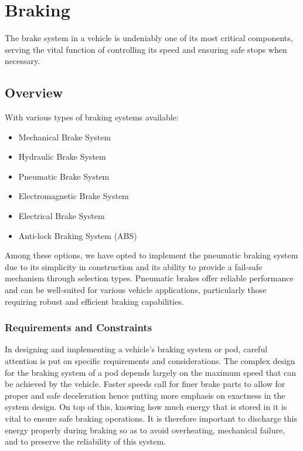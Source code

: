 \section{Braking}
The brake system in a vehicle is undeniably one of its most critical components, serving the vital function of controlling its speed and ensuring safe stops when necessary.


\subsection{Overview}
With various types of braking systems available:

\begin{itemize}
    \item Mechanical Brake System
    \item Hydraulic Brake System
    \item Pneumatic Brake System
    \item Electromagnetic Brake System
    \item Electrical Brake System
  
    \item Anti-lock Braking System (ABS)
  
    
\end{itemize}

Among these options, we have opted to implement the pneumatic braking system due to its simplicity in construction and its ability to provide a fail-safe mechanism through selection types. Pneumatic brakes offer reliable performance and can be well-suited for various vehicle applications, particularly those requiring robust and efficient braking capabilities.
\subsubsection{Requirements and Constraints}
In designing and implementing a vehicle's braking system or pod, careful attention is put on specific requirements and considerations. The complex design for the braking system of a pod depends largely on the maximum speed that can be achieved by the vehicle. Faster speeds call for finer brake parts to allow for proper and safe deceleration hence putting more emphasis on exactness in the system design. On top of this, knowing how much energy that is stored in it is vital to ensure safe braking operations. It is therefore important to discharge this energy properly during braking so as to avoid overheating, mechanical failure, and to preserve the reliability of this system.\\


